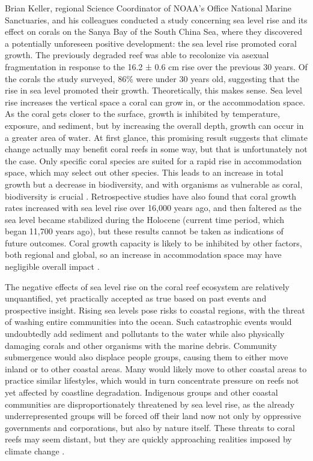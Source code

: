 \documentclass{book}\usepackage{knitr}
\begin{document}
Brian Keller, regional Science Coordinator of NOAA's Office National Marine Sanctuaries, and his colleagues conducted a study concerning sea level rise and its effect on corals on the Sanya Bay of the South China Sea, where they discovered a potentially unforeseen positive development: the sea level rise promoted coral growth. The previously degraded reef was able to recolonize via asexual fragmentation in response to the 16.2 ± 0.6 cm rise over the previous 30 years. Of the corals the study surveyed, 86\% were under 30 years old, suggesting that the rise in sea level promoted their growth. Theoretically, this makes sense. Sea level rise increases the vertical space a coral can grow in, or the accommodation space. As the coral gets closer to the surface, growth is inhibited by temperature, exposure, and sediment, but by increasing the overall depth, growth can occur in a greater area of water. At first glance, this promising result suggests that climate change actually may benefit coral reefs in some way, but that is unfortunately not the case. Only specific coral species are suited for a rapid rise in accommodation space, which may select out other species. This leads to an increase in total growth but a decrease in biodiversity, and with organisms as vulnerable as coral, biodiversity is crucial \citep{https://doi.org/10.1029/2018JC014534}. Retrospective studies have also found that coral growth rates increased with sea level rise over 16,000 years ago, and then faltered as the sea level became stabilized during the Holocene (current time period, which began 11,700 years ago), but these results cannot be taken as indications of future outcomes. Coral growth capacity is likely to be inhibited by other factors, both regional and global, so an increase in accommodation space may have negligible overall impact \citep{Keller2009ClimateCC}.

The negative effects of sea level rise on the coral reef ecosystem are relatively unquantified, yet practically accepted as true based on past events and prospective insight. Rising sea levels pose risks to coastal regions, with the threat of washing entire communities into the ocean.  Such catastrophic events would undoubtedly add sediment and pollutants to the water while also physically damaging corals and other organisms with the marine debris. Community submergence would also displace people groups, causing them to either move inland or to other coastal areas. Many would likely move to other coastal areas to practice similar lifestyles, which would in turn concentrate pressure on reefs not yet affected by coastline degradation. Indigenous groups and other coastal communities are disproportionately threatened by sea level rise, as the already underrepresented groups will be forced off their land now not only by oppressive governments and corporations, but also by nature itself. These threats to coral reefs may seem distant, but they are quickly approaching realities imposed by climate change \citep{Keller2009ClimateCC}.
\end{document}
